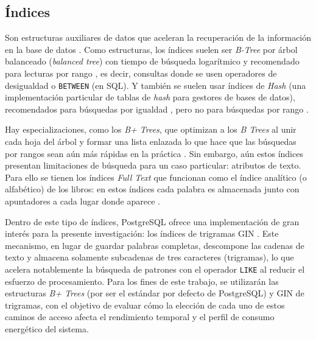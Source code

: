 \documentclass[12pt, letter paper]{report}
\begin{document}
      \subsection{Índices} %
      \label{sub:índices}
        Son estructuras auxiliares de datos que aceleran la recuperación de la
        información en la base de datos \cite{silberschatz2019database,
        elmasri2016fundamentals, connolly2014database,
        ramakrishnan2003database}. Como estructuras, los índices suelen ser
        \textit{B-Tree} por árbol balanceado (\textit{balanced tree}) con tiempo
        de búsqueda logarítmico \cite{silberschatz2019database} y recomendado
        para lecturas por rango \cite{ramakrishnan2003database}, es decir,
        consultas donde se usen operadores de desigualdad o \texttt{BETWEEN} (en
        SQL). Y también se suelen usar índices de \textit{Hash} (una
        implementación particular de tablas de \textit{hash} para gestores de
        bases de datos), recomendados para búsquedas por igualdad
        \cite{elmasri2016fundamentals}, pero no para búsquedas por rango
        \cite{connolly2014database}.

        Hay especializaciones, como los \textit{B+ Trees}, que optimizan a los
        \textit{B Trees} al unir cada hoja del árbol y formar una lista
        enlazada lo que hace que las búsquedas por rangos sean aún más rápidas
        en la práctica \cite{ramakrishnan2003database}. Sin embargo, aún estos
        índices presentan limitaciones de búsqueda para un caso particular:
        atributos de texto. Para ello se tienen los índices \textit{Full Text}
        que funcionan como el índice analítico (o alfabético) de los libros:
        en estos índices cada palabra es almacenada junto con apuntadores a
        cada lugar donde aparece \cite{silberschatz2019database,
        ramakrishnan2003database, manning2008introduction}.

        Dentro de este tipo de índices, PostgreSQL ofrece una implementación de
        gran interés para la presente investigación: los índices de trigramas
        GIN \cite{silberschatz2019database, elmasri2016fundamentals,
        ramakrishnan2003database}. Este mecanismo, en lugar de guardar palabras
        completas, descompone las cadenas de texto y almacena solamente
        subcadenas de tres caracteres (trigramas), lo que acelera notablemente
        la búsqueda de patrones con el operador \texttt{LIKE} al reducir el
        esfuerzo de procesamiento. Para los fines de este trabajo, se utilizarán
        las estructuras \textit{B+ Trees} (por ser el estándar por defecto de
        PostgreSQL) y GIN de trigramas, con el objetivo de evaluar cómo la
        elección de cada uno de estos caminos de acceso afecta el rendimiento
        temporal y el perfil de consumo energético del sistema.
\end{document}
